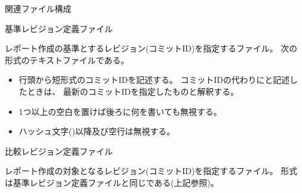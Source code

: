 \begin{Description}{関連ファイル構成}
    \begin{narrow}\begin{minipage}{.8\textwidth}
  \end{minipage}\end{narrow}
  \medskip
  基準レビジョン定義ファイル
  \begin{narrow}
  	レポート作成の基準とするレビジョン(コミットID)を指定するファイル。
	次の形式のテキストファイルである。
	\begin{itemize}
	  \item	行頭から短形式のコミットIDを記述する。
	  	コミットIDの代わりにと記述したときは、
		最新のコミットIDを指定したものと解釈する。
	  \item	1つ以上の空白を置けば後ろに何を書いても無視する。
	  \item	ハッシュ文字(\SQuote{\tt{\#}})以降及び空行は無視する。
	\end{itemize}
  \end{narrow}
  比較レビジョン定義ファイル
  \begin{narrow}
  	レポート作成の対象となるレビジョン(コミットID)を指定するファイル。
	形式は基準レビジョン定義ファイルと同じである(上記参照)。
  \end{narrow}
\end{Description}

